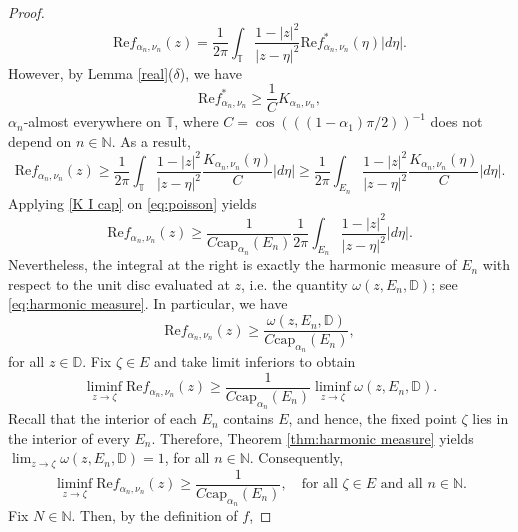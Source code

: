 \documentclass[12pt]{amsart}
\theoremstyle{definition}\newtheorem{remark}[theorem]{Remark}
\theoremstyle{definition}\newtheorem{example}[theorem]{Example}
\theoremstyle{definition}\newtheorem{definition}{Definition}
\numberwithin{equation}{section}
\newcommand\DD{{\mathbb D}}
\newcommand\TT{{\mathbb T}}
\begin{document}
\begin{proof}
\begin{equation*}
\mathrm{Re}f_{\alpha_n,\nu_n}(z)=\frac{1}{2\pi}\int_{\TT}\frac{1-|z|^2}{|z-\eta|^2}\mathrm{Re}f^*_{\alpha_n,\nu_n}(\eta)|d\eta|.
\end{equation*} 
However, by Lemma \ref{real}\textup{($\delta$)}, we have
\begin{equation*}
\mathrm{Re}f^*_{\alpha_n,\nu_{n}}\geq \frac{1}{C}K_{\alpha_n,\nu_{n}},
\end{equation*}
$\alpha_n$-almost everywhere on $\TT$, where $C=\cos(((1-\alpha_1)\pi/2))^{-1}$ does not depend on $n\in\mathbb{N}$. As a result,
\begin{equation}\label{eq:poisson}
\mathrm{Re}f_{\alpha_n,\nu_n}(z)\ge \frac{1}{2\pi}\int_{\TT}\frac{1-|z|^2}{|z-\eta|^2}\frac{K_{\alpha_n,\nu_n}(\eta)}{C}|d\eta| \ge \frac{1}{2\pi}\int_{E_n}\frac{1-|z|^2}{|z-\eta|^2}\frac{K_{\alpha_n,\nu_n}(\eta)}{C}|d\eta|.
\end{equation}
Applying \eqref{K I cap} on \eqref{eq:poisson} yields
\begin{equation*}
\mathrm{Re}f_{\alpha_n,\nu_n}(z)\ge\frac{1}{C\mathrm{cap}_{\alpha_n}(E_n)}\frac{1}{2\pi}\int_{E_n}\frac{1-|z|^2}{|z-\eta|^2}|d\eta|.  \end{equation*}
Nevertheless, the integral at the right is exactly the harmonic measure of $E_n$ with respect to the unit disc evaluated at $z$, i.e. the quantity $\omega(z,E_n,\DD)$; see \eqref{eq:harmonic measure}. In particular, we have
\begin{equation*}
 \mathrm{Re}f_{\alpha_n,\nu_n}(z)\ge \frac{\omega(z,E_n,\DD)}{C\mathrm{cap}_{\alpha_n}(E_n)},   
\end{equation*}
for all $z\in\DD$. Fix $\zeta\in E$ and take limit inferiors to obtain
\begin{equation*}
   \liminf_{z\to\zeta}\mathrm{Re}f_{\alpha_n,\nu_n}(z)\ge \frac{1}{C\mathrm{cap}_{\alpha_n}(E_n)}\liminf_{z\to\zeta}\omega(z,E_n,\DD). 
\end{equation*}
Recall that the interior of each $E_n$ contains $E$, and hence, the fixed point $\zeta$ lies in the interior of every $E_n$. Therefore, Theorem \ref{thm:harmonic measure} yields $\lim_{z\to\zeta}\omega(z,E_n,\DD)=1$, for all $n\in\mathbb{N}$. Consequently,
\begin{equation}\label{AAA}
\liminf_{z\to\zeta}\mathrm{Re}f_{\alpha_n,\nu_n}(z)\ge\frac{1}{C\mathrm{cap}_{\alpha_n}(E_n)}, \quad\text{for all }\zeta\in E \text{ and all }n\in\mathbb{N}.
\end{equation}
Fix $N\in \mathbb{N}$. Then, by the definition of $f$,

\end{proof}
\end{document}
